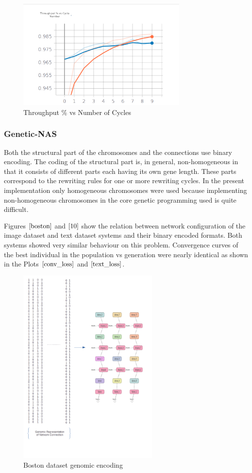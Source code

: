 \documentclass[conference]{IEEEtran}
\begin{document}
\begin{figure}[!b]
\centerline{\includegraphics[width=85mm]{throughput_pct.png}}
\caption{Throughput \% vs Number of Cycles}
\label{throughput_pct}
\end{figure}

\subsubsection{Genetic-NAS}

Both the structural part of the chromosomes and the connections use binary encoding. The coding of the structural part is, in general, non-homogeneous in that it consists of different parts each having its own gene length. These parts correspond to the rewriting rules for one or more rewriting cycles. In the present implementation only homogeneous chromosomes were used because implementing non-homogeneous chromosomes in the core genetic programming used is quite difficult. 

Figures $\ref{boston}$ and $\ref{10}$ show the relation between network configuration of the image dataset and text dataset systems and their binary encoded formats. Both systems showed very similar behaviour on this problem. Convergence curves of the best individual in the population vs generation were nearly identical as shown in the Plots $\ref{conv_loss}$ and $\ref{text_loss}$.
\begin{figure}[!b]
\centerline{\includegraphics[width=70mm]{boston.png}}
\caption{Boston dataset genomic encoding}
\label{boston}
\end{figure}
\end{document}
